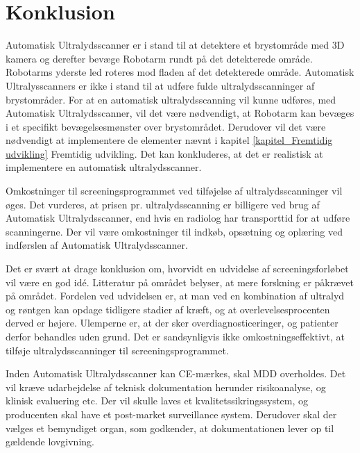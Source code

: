 \chapter{Konklusion}\label{kapitel_Konklusion}
Automatisk Ultralydsscanner er i stand til at detektere et brystområde med 3D kamera og derefter bevæge Robotarm rundt på det detekterede område. Robotarms yderste led roteres mod fladen af det detekterede område. Automatisk Ultralysscanners er ikke i stand til at udføre fulde ultralydsscanninger af brystområder. For at en automatisk ultralydsscanning vil kunne udføres, med Automatisk Ultralydsscanner, vil det være nødvendigt, at Robotarm kan bevæges i et specifikt bevægelsesmønster over brystområdet. Derudover vil det være nødvendigt at implementere de elementer nævnt i kapitel \ref{kapitel_Fremtidig udvikling} Fremtidig udvikling. Det kan konkluderes, at det er realistisk at implementere en automatisk ultralydsscanner. 

Omkostninger til screeningsprogrammet ved tilføjelse af ultralydsscanninger vil øges. Det vurderes, at prisen pr. ultralydsscanning er billigere ved brug af Automatisk Ultralydsscanner, end hvis en radiolog har transporttid for at udføre scanningerne. Der vil være omkostninger til indkøb, opsætning og oplæring ved indførslen af Automatisk Ultralydsscanner.  

Det er svært at drage konklusion om, hvorvidt en udvidelse af screeningsforløbet vil være en god idé. Litteratur på området belyser, at mere forskning er påkrævet på området. Fordelen ved udvidelsen er, at man ved en kombination af ultralyd og røntgen kan opdage tidligere stadier af kræft, og at overlevelsesprocenten  derved er højere. Ulemperne er, at der sker overdiagnosticeringer, og patienter derfor behandles uden grund.  Det er sandsynligvis ikke omkostningseffektivt, at tilføje ultralydsscanninger til screeningsprogrammet. 

Inden Automatisk Ultralydsscanner kan CE-mærkes, skal MDD overholdes. Det vil kræve udarbejdelse af teknisk dokumentation herunder risikoanalyse, og klinisk evaluering etc. Der vil skulle laves et kvalitetssikringssystem, og producenten skal have et post-market surveillance system. Derudover skal der vælges et bemyndiget organ, som godkender, at dokumentationen lever op til gældende lovgivning.  